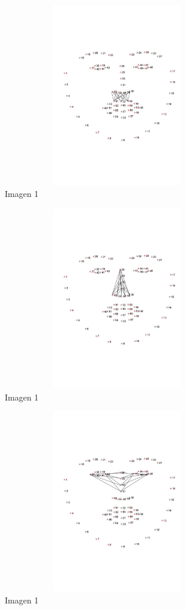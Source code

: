 \documentclass{article}
\begin{document}
\begin{figure}[H]
  \centering
  \includegraphics[width=100mm, height=80mm]{images/moustache_distances.jpg}
  \caption{Imagen 1}
\end{figure}  
  
\begin{figure}[H]
  \centering
  \includegraphics[width=100mm, height=80mm]{images/nasal_septum_distances.jpg}
  \caption{Imagen 1}
\end{figure}
  
\begin{figure}[H]
  \centering
  \includegraphics[width=100mm, height=80mm]{images/nose_distances.jpg}
  \caption{Imagen 1}
\end{figure} 
  
\end{document}
